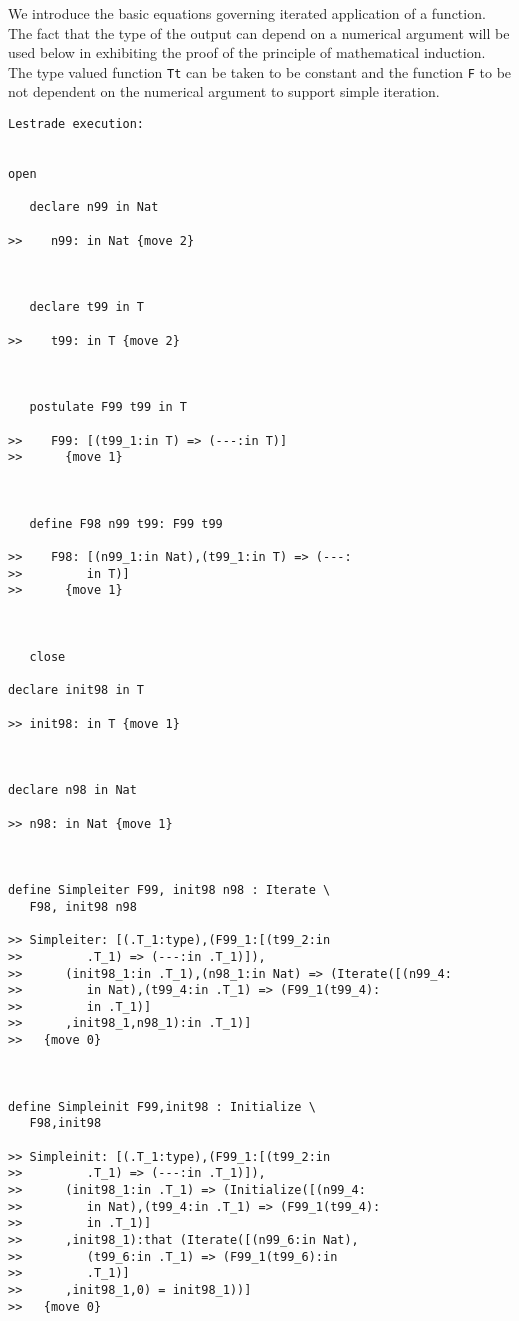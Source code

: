 \documentclass[12pt]{article}
\begin{document}
We introduce the basic equations governing iterated application of a function.  The fact that the type of the output can depend on a numerical argument
will be used below in exhibiting the proof of the principle of mathematical induction.  The type valued function {\tt Tt} can be taken to be constant and
the function {\tt F} to be not dependent on the numerical argument to support simple iteration.

\begin{verbatim}Lestrade execution:


open

   declare n99 in Nat

>>    n99: in Nat {move 2}



   declare t99 in T

>>    t99: in T {move 2}



   postulate F99 t99 in T

>>    F99: [(t99_1:in T) => (---:in T)]
>>      {move 1}



   define F98 n99 t99: F99 t99

>>    F98: [(n99_1:in Nat),(t99_1:in T) => (---:
>>         in T)]
>>      {move 1}



   close

declare init98 in T

>> init98: in T {move 1}



declare n98 in Nat

>> n98: in Nat {move 1}



define Simpleiter F99, init98 n98 : Iterate \
   F98, init98 n98

>> Simpleiter: [(.T_1:type),(F99_1:[(t99_2:in
>>         .T_1) => (---:in .T_1)]),
>>      (init98_1:in .T_1),(n98_1:in Nat) => (Iterate([(n99_4:
>>         in Nat),(t99_4:in .T_1) => (F99_1(t99_4):
>>         in .T_1)]
>>      ,init98_1,n98_1):in .T_1)]
>>   {move 0}



define Simpleinit F99,init98 : Initialize \
   F98,init98

>> Simpleinit: [(.T_1:type),(F99_1:[(t99_2:in
>>         .T_1) => (---:in .T_1)]),
>>      (init98_1:in .T_1) => (Initialize([(n99_4:
>>         in Nat),(t99_4:in .T_1) => (F99_1(t99_4):
>>         in .T_1)]
>>      ,init98_1):that (Iterate([(n99_6:in Nat),
>>         (t99_6:in .T_1) => (F99_1(t99_6):in
>>         .T_1)]
>>      ,init98_1,0) = init98_1))]
>>   {move 0}




\end{verbatim}
\end{document}
